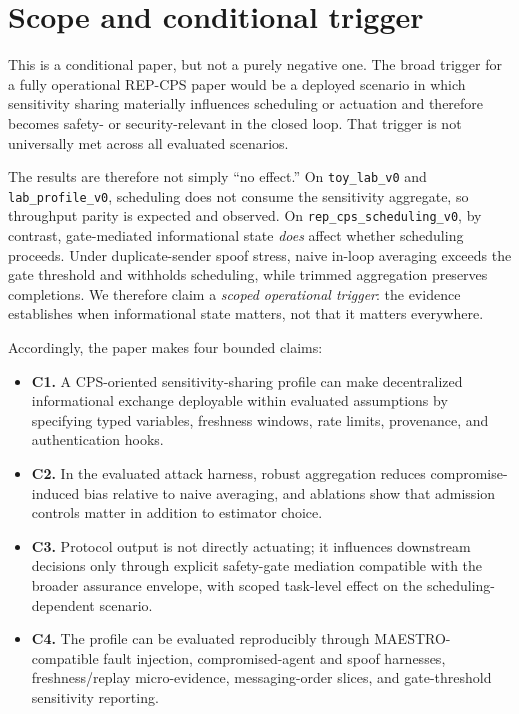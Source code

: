 \documentclass[11pt]{article}
\newcommand{\repcps}{REP-CPS}
\newcommand{\maestro}{MAESTRO}
\newcommand{\code}[1]{\texttt{#1}}
\begin{document}
\section{Scope and conditional trigger}

This is a conditional paper, but not a purely negative one. The broad trigger for a fully operational \repcps{} paper would be a deployed scenario in which sensitivity sharing materially influences scheduling or actuation and therefore becomes safety- or security-relevant in the closed loop. That trigger is not universally met across all evaluated scenarios.

The results are therefore not simply ``no effect.'' On \code{toy\_lab\_v0} and \code{lab\_profile\_v0}, scheduling does not consume the sensitivity aggregate, so throughput parity is expected and observed. On \code{rep\_cps\_scheduling\_v0}, by contrast, gate-mediated informational state \emph{does} affect whether scheduling proceeds. Under duplicate-sender spoof stress, naive in-loop averaging exceeds the gate threshold and withholds scheduling, while trimmed aggregation preserves completions. We therefore claim a \emph{scoped operational trigger}: the evidence establishes when informational state matters, not that it matters everywhere.

Accordingly, the paper makes four bounded claims:
\begin{itemize}[leftmargin=1.5em]
    \item \textbf{C1.} A CPS-oriented sensitivity-sharing profile can make decentralized informational exchange deployable within evaluated assumptions by specifying typed variables, freshness windows, rate limits, provenance, and authentication hooks.
    \item \textbf{C2.} In the evaluated attack harness, robust aggregation reduces compromise-induced bias relative to naive averaging, and ablations show that admission controls matter in addition to estimator choice.
    \item \textbf{C3.} Protocol output is not directly actuating; it influences downstream decisions only through explicit safety-gate mediation compatible with the broader assurance envelope, with scoped task-level effect on the scheduling-dependent scenario.
    \item \textbf{C4.} The profile can be evaluated reproducibly through \maestro-compatible fault injection, compromised-agent and spoof harnesses, freshness/replay micro-evidence, messaging-order slices, and gate-threshold sensitivity reporting.
\end{itemize}
\end{document}
